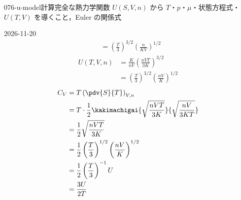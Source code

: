 \documentclass[uplatex,dvipdfmx,a4paper,11pt]{jsarticle}
\begin{document}
\begin{mondai}{076-u-model}{計算}{完全な熱力学関数 $U(S,V,n)$ から $T$・$p$・$\mu$・状態方程式・$U(T,V)$ を導くこと，Euler の関係式}
\begin{kotaeutsushi}{2026-11-20}
\begin{align*}
&=\left(\frac{T}{3}\right)^{3/2}\left(\frac{n}{KV}\right)^{1/2}
\end{align*}
\begin{align*}
U(T,V,n)&=\frac{K}{nV}\left(\frac{nVT}{3K}\right)^{3/2}\\
&=\left(\frac{T}{3}\right)^{3/2}\left(\frac{nV}{K}\right)^{1/2}
\end{align*}
\begin{align*}
C_{V}&=T\left(\pdv{S}{T}\right)_{V,n}\\
&=T\cdot\frac{1}{2}\kakimachigai{\sqrt{\frac{nVT}{3K}}}{\sqrt{\frac{nV}{3KT}}}\\
&=\frac{1}{2}\sqrt{\frac{nVT}{3K}}\\
&=\frac{1}{2}\left(\frac{T}{3}\right)^{1/2}\left(\frac{nV}{K}\right)^{1/2}\\
&=\frac{1}{2}\left(\frac{T}{3}\right)^{-1}U\\
&=\frac{3U}{2T}
\end{align*}
\end{kotaeutsushi}
\end{mondai}
\end{document}
